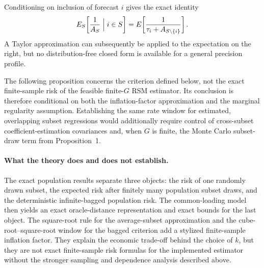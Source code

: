 
Conditioning on inclusion of forecast $i$ gives the exact identity
\[
 E_S\!\left[\frac{1}{A_S}\Bigm|i\in S\right]
 =E\!\left[\frac{1}{\tau_i+A_{S\setminus\{i\}}}\right].
\]
A Taylor approximation can subsequently be applied to the expectation on the
right, but no distribution-free closed form is available for a general
precision profile.



The following proposition concerns the criterion defined below, not the exact
finite-sample risk of the feasible finite-$G$ RSM estimator.  Its conclusion is
therefore conditional on both the inflation-factor approximation and the
marginal regularity assumption.  Establishing the same rate window for
estimated, overlapping subset regressions would additionally require control
of cross-subset coefficient-estimation covariances and, when $G$ is finite,
the Monte Carlo subset-draw term from Proposition~1.


\paragraph{What the theory does and does not establish.}
The exact population results separate three objects: the risk of one randomly
drawn subset, the expected risk after finitely many population subset draws,
and the deterministic infinite-bagged population risk.  The common-loading
model then yields an exact oracle-distance representation and exact bounds for
the last object.  The square-root rule for the average-subset approximation
and the cube-root--square-root window for the bagged criterion add a stylized
finite-sample inflation factor.  They explain the economic trade-off behind
the choice of $k$, but they are not exact finite-sample risk formulas for the
implemented estimator without the stronger sampling and dependence analysis
described above.


